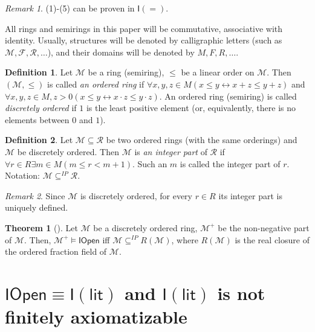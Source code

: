 \documentclass[a4paper,14pt]{article}
\theoremstyle{definition}
\newtheorem{definition}{Definition}[section]
\theoremstyle{theorem}
\newtheorem{theorem}{Theorem}[section]
\theoremstyle{lemma}
\theoremstyle{proposition}
\theoremstyle{remark}
\newtheorem*{remark}{Remark}
\theoremstyle{corollary}
\theoremstyle{problem}
\theoremstyle{hypothesis}
\begin{document}
\begin{remark}
    (1)-(5) can be proven in $\mathsf{I(=)}$.
\end{remark}

All rings and semirings in this paper will be commutative, associative with identity. Usually, structures will be denoted by calligraphic letters (such as $\mathcal{M, F, R}, \dots$), and their domains will be denoted by $M, F, R, \dots$. 

\begin{definition}
    Let $\mathcal M$ be a ring (semiring), $\leqslant$ be a linear order on $\mathcal M$. Then $(\mathcal M, \leqslant)$ is called \textit{an ordered ring} if $\forall x, y, z \in M (x \leqslant y \leftrightarrow x + z \leqslant y + z)$ and $\forall x, y, z \in M, z > 0 (x \leqslant y \leftrightarrow x \cdot z \leqslant y \cdot z)$. An ordered ring (semiring) is called \textit{discretely ordered} if $1$ is the least positive element (or, equivalently, there is no elements between $0$ and $1$).
\end{definition}

\begin{definition}
    Let $\mathcal{M} \subseteq \mathcal{R}$ be two ordered rings (with the same orderings) and $\mathcal M$ be discretely ordered. Then $\mathcal M$ is \textit{an integer part} of $\mathcal R$ if $\forall r \in R \exists m \in M (m \leqslant r < m + 1)$. Such an $m$ is called the integer part of $r$. Notation: $\mathcal M \subseteq^{IP} \mathcal R$.
\end{definition}

\begin{remark}
    Since $\mathcal M$ is discretely ordered, for every $r \in R$ its integer part is uniquely defined.
\end{remark}

\begin{theorem}[\cite{shepherdson1964}]
    Let $\mathcal{M}$ be a discretely ordered ring, $\mathcal M^+$ be the non-negative part of $\mathcal M$. Then, $\mathcal{M}^+ \vDash \mathsf{IOpen}$ iff $\mathcal M \subseteq^{IP} R(\mathcal M)$, where $R(\mathcal M)$ is the real closure of the ordered fraction field of $\mathcal M$.
\end{theorem}

\section{$\mathsf{IOpen} \equiv \mathsf{I(lit)}$ and $\mathsf{I(lit)}$ is not finitely axiomatizable}
\end{document}
